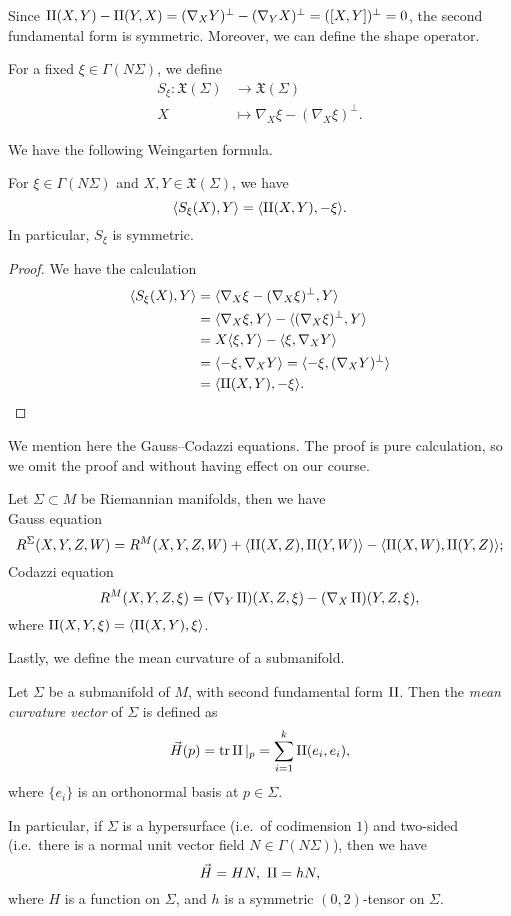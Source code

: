 Since $\operatorname{II}(X,Y)-\operatorname{II}(Y,X)=(\nabla_XY)^\perp-(\nabla_YX)^\perp=([X,Y])^\perp=0$, the second fundamental form is symmetric.
Moreover, we can define the shape operator.
\begin{defn}
    For a fixed $\xi\in\Gamma(N\Sigma)$, we define
    \begin{align*}
        S_\xi:\mathfrak{X}(\Sigma)&\to\mathfrak{X}(\Sigma)\\
        X&\mapsto\nabla_X\xi-(\nabla_X\xi)^\perp.
    \end{align*}
\end{defn}

We have the following Weingarten formula.
\begin{prop}
    For $\xi\in\Gamma(N\Sigma)$ and $X,Y\in\mathfrak{X}(\Sigma)$, we have
    \[\langle S_\xi(X),Y\rangle=\langle\operatorname{II}(X,Y),-\xi\rangle.\]
    In particular, $S_\xi$ is symmetric.
\end{prop}
\begin{proof}
    We have the calculation
    \begin{align*}
        \langle S_\xi(X),Y\rangle&=\langle\nabla_X\xi-(\nabla_X\xi)^\perp,Y\rangle\\
        &=\langle\nabla_X\xi,Y\rangle-\langle(\nabla_X\xi)^\perp,Y\rangle\\
        &=X\langle\xi,Y\rangle-\langle\xi,\nabla_XY\rangle\\
        &=\langle-\xi,\nabla_XY\rangle=\langle-\xi,(\nabla_XY)^\perp\rangle\\
        &=\langle\operatorname{II}(X,Y),-\xi\rangle.\qedhere
    \end{align*}
\end{proof}

We mention here the Gauss--Codazzi equations.
The proof is pure calculation, so we omit the proof and without having effect on our course.
\begin{thm}
    Let $\Sigma\subset M$ be Riemannian manifolds, then we have\\
    Gauss equation
    \[R^\Sigma(X,Y,Z,W)=R^M(X,Y,Z,W)+\langle\operatorname{II}(X,Z),\operatorname{II}(Y,W)\rangle-\langle\operatorname{II}(X,W),\operatorname{II}(Y,Z)\rangle;\]
    Codazzi equation
    \[R^M(X,Y,Z,\xi)=(\nabla_Y\operatorname{II})(X,Z,\xi)-(\nabla_X\operatorname{II})(Y,Z,\xi),\]
    where $\operatorname{II}(X,Y,\xi)=\langle\operatorname{II}(X,Y),\xi\rangle$.
\end{thm}

Lastly, we define the mean curvature of a submanifold.
\begin{defn}
    Let $\Sigma$ be a submanifold of $M$, with second fundamental form $\operatorname{II}$.
    Then the \emph{mean curvature vector} of $\Sigma$ is defined as
    \[\vec{H}(p)=\operatorname{tr}\operatorname{II}|_p=\sum_{i=1}^k\operatorname{II}(e_i,e_i),\]
    where $\{e_i\}$ is an orthonormal basis at $p\in\Sigma$.

    In particular, if $\Sigma$ is a hypersurface (i.e.\ of codimension $1$) and two-sided (i.e.\ there is a normal unit vector field $N\in\Gamma(N\Sigma)$), then we have
    \[\vec{H}=HN,\ \operatorname{II}=hN,\]
    where $H$ is a function on $\Sigma$, and $h$ is a symmetric $(0,2)$-tensor on $\Sigma$.
\end{defn}

